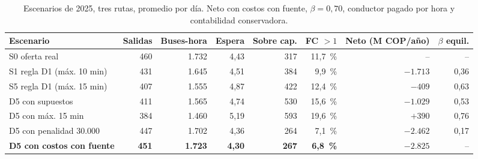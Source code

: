 \begin{table}[t]
  \centering\footnotesize
  \setlength{\tabcolsep}{4pt}
  \caption{Escenarios de 2025, tres rutas, promedio por día. Neto con costos con fuente, $\beta = 0{,}70$, conductor
  pagado por hora y contabilidad conservadora.}
  \label{tab:escenarios}
  \begin{tabular}{@{}l r r r r r r r@{}}
    \toprule
    Escenario & Salidas & Buses-hora & Espera & Sobre cap. & FC $> 1$ & Neto (M COP/año) & $\beta$ equil. \\
    \midrule
    S0 oferta real & 460 & 1.732 & 4,43 & 317 & 11,7~\% & -- & -- \\
    S1 regla D1 (máx. 10 min) & 431 & 1.645 & 4,51 & 384 & 9,9~\% & $-1.713$ & 0,36 \\
    S5 regla D1 (máx. 15 min) & 407 & 1.555 & 4,87 & 422 & 12,4~\% & $-409$ & 0,63 \\
    D5 con supuestos & 411 & 1.565 & 4,74 & 530 & 15,6~\% & $-1.029$ & 0,53 \\
    D5 con máx. 15 min & 384 & 1.460 & 5,19 & 593 & 19,6~\% & $+390$ & 0,76 \\
    D5 con penalidad 30.000 & 447 & 1.702 & 4,36 & 264 & 7,1~\% & $-2.462$ & 0,17 \\
    \textbf{D5 con costos con fuente} & \textbf{451} & \textbf{1.723} & \textbf{4,30} & \textbf{267} & \textbf{6,8~\%} & $\bm{-2.825}$ & -- \\
    \bottomrule
  \end{tabular}
\end{table}


